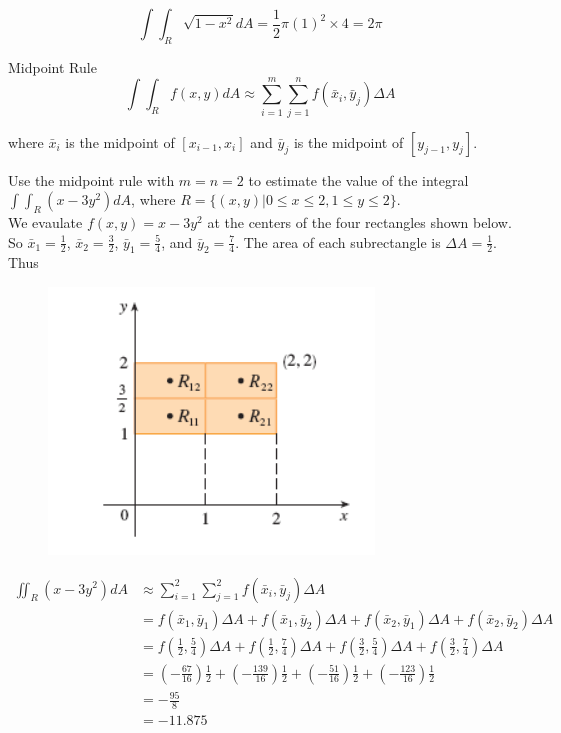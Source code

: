         \[
            \int \int_R \sqrt{1-x^2} dA = \frac{1}{2} \pi (1)^2 \times 4 = 2\pi
        \]

        \begin{theorem}{Midpoint Rule}
            \[
                \int \int_R f(x,y) dA \approx \sum^m_{i=1} \sum^n_{j=1} f(\bar{x}_i, \bar{y}_j) \Delta A
            \]

            where $\bar{x}_i$ is the midpoint of $[x_{i-1}, x_i]$ and $\bar{y}_j$ is the midpoint of $[y_{j-1}, y_j]$.
        \end{theorem}

        \textit{} Use the midpoint rule with $m=n=2$ to estimate the value of the integral $\int \int_R (x-3y^2)dA$, where $R = \{(x,y) | 0 \leq x \leq 2, 1 \leq y \leq 2\}$. \\

        We evaulate $f(x,y) = x-3y^2$ at the centers of the four rectangles shown below. So $\bar{x}_1 = \frac{1}{2}$, $\bar{x}_2 = \frac{3}{2}$, $\bar{y}_1 = \frac{5}{4}$, and $\bar{y}_2 = \frac{7}{4}$. The area of each
        subrectangle is $\Delta A = \frac{1}{2}$. Thus

        \begin{figure}[hbt!]
            \centering
            \includegraphics[scale = 0.75]{Resources/15.1_Rectangles}
        \end{figure}

        \begin{align*}
            \iint_R (x-3y^2) dA &\approx \sum^2_{i=1} \sum^2_{j=1} f\left(\bar{x}_i, \bar{y}_j\right) \Delta A \\
                                &= f(\bar{x}_1, \bar{y}_1) \Delta A + f(\bar{x}_1, \bar{y}_2) \Delta A + f(\bar{x}_2, \bar{y}_1) \Delta A + f(\bar{x}_2, \bar{y}_2) \Delta A \\
                                &= f\left(\frac{1}{2}, \frac{5}{4}\right) \Delta A + f\left(\frac{1}{2}, \frac{7}{4}\right)\Delta A + f\left(\frac{3}{2}, \frac{5}{4}\right) \Delta A + f\left(\frac{3}{2}, \frac{7}{4}\right) \Delta A \\
                                &= \left(-\frac{67}{16}\right)\frac{1}{2} + \left(-\frac{139}{16}\right)\frac{1}{2} + \left(-\frac{51}{16}\right)\frac{1}{2} + \left(-\frac{123}{16}\right) \frac{1}{2} \\
                                &= -\frac{95}{8} \\
                                &= -11.875
        \end{align*}

